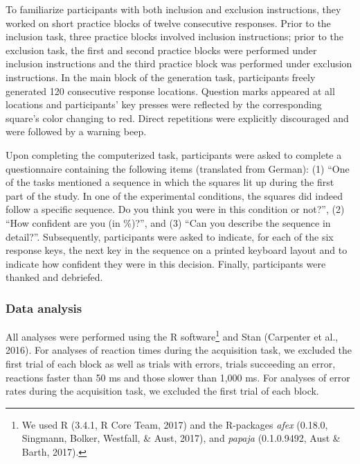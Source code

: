 \documentclass[man]{apa6}
\theoremstyle{definition}
\theoremstyle{definition}
\theoremstyle{definition}
\theoremstyle{remark}
\begin{document}
To familiarize participants with both inclusion and exclusion
instructions, they worked on short practice blocks of twelve consecutive
responses. Prior to the inclusion task, three practice blocks involved
inclusion instructions; prior to the exclusion task, the first and
second practice blocks were performed under inclusion instructions and
the third practice block was performed under exclusion instructions. In
the main block of the generation task, participants freely generated 120
consecutive response locations. Question marks appeared at all locations
and participants' key presses were reflected by the corresponding
square's color changing to red. Direct repetitions were explicitly
discouraged and were followed by a warning beep.

Upon completing the computerized task, participants were asked to
complete a questionnaire containing the following items (translated from
German): (1) \enquote{One of the tasks mentioned a sequence in which the
squares lit up during the first part of the study. In one of the
experimental conditions, the squares did indeed follow a specific
sequence. Do you think you were in this condition or not?}, (2)
\enquote{How confident are you (in \%)?}, and (3) \enquote{Can you
describe the sequence in detail?}. Subsequently, participants were asked
to indicate, for each of the six response keys, the next key in the
sequence on a printed keyboard layout and to indicate how confident they
were in this decision. Finally, participants were thanked and debriefed.

\subsubsection{Data analysis}\label{data-analysis}

All analyses were performed using the R software\footnote{We used R
  (3.4.1, R Core Team, 2017) and the R-packages \emph{afex} (0.18.0,
  Singmann, Bolker, Westfall, \& Aust, 2017), and \emph{papaja}
  (0.1.0.9492, Aust \& Barth, 2017).} and Stan (Carpenter et al., 2016).
For analyses of reaction times during the acquisition task, we excluded
the first trial of each block as well as trials with errors, trials
succeeding an error, reactions faster than 50 ms and those slower than
1,000 ms. For analyses of error rates during the acquisition task, we
excluded the first trial of each block.
\end{document}
